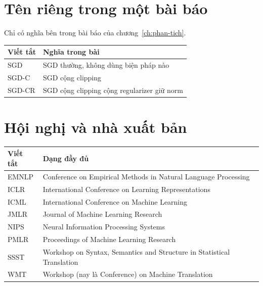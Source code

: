 \section{Tên riêng trong một bài báo}
\label{sec:app-c-ten-rieng}

Chỉ có nghĩa bên trong bài báo của chương~\ref{ch:phan-tich}.

\small
\begin{tabular}{@{}ll@{}}
\toprule
Viết tắt & Nghĩa trong bài \\
\midrule
SGD    & SGD thường, không dùng biện pháp nào \\
SGD-C  & SGD cộng clipping \\
SGD-CR & SGD cộng clipping cộng regularizer giữ norm \\
\bottomrule
\end{tabular}
\normalsize

\section{Hội nghị và nhà xuất bản}
\label{sec:app-c-hoi-nghi}

\small
\begin{tabular}{@{}ll@{}}
\toprule
Viết tắt & Dạng đầy đủ \\
\midrule
EMNLP & Conference on Empirical Methods in Natural Language Processing \\
ICLR & International Conference on Learning Representations \\
ICML & International Conference on Machine Learning \\
JMLR & Journal of Machine Learning Research \\
NIPS & Neural Information Processing Systems \\
PMLR & Proceedings of Machine Learning Research \\
SSST & Workshop on Syntax, Semantics and Structure in Statistical Translation \\
WMT & Workshop (nay là Conference) on Machine Translation \\
\bottomrule
\end{tabular}
\normalsize
